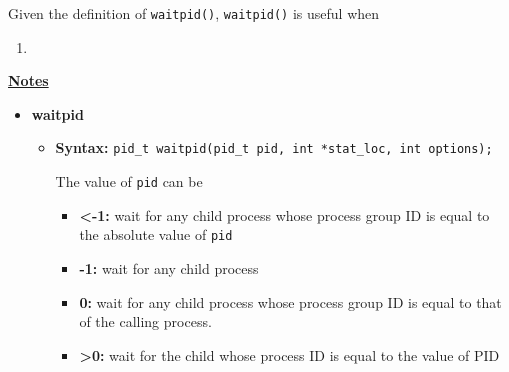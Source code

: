 \documentclass[12pt]{article}
\begin{document}
\begin{enumerate}[1.]
    \bigskip

    Given the definition of \texttt{waitpid()}, \texttt{waitpid()} is useful when

    \begin{enumerate}[1)]
        \item
    \end{enumerate}

    \bigskip

    \underline{\textbf{Notes}}

    \bigskip

    \begin{itemize}
        \item \textbf{waitpid}

        \begin{itemize}
            \item \textbf{Syntax:} \texttt{pid\_t waitpid(pid\_t pid, int *stat\_loc, int options);}

            \bigskip

            The value of \texttt{pid} can be
            \begin{itemize}
                \item \textbf{<-1:} wait for any child process whose process group ID is equal to
                the absolute value of \texttt{pid}
                \item \textbf{-1:} wait for any child process
                \item \textbf{0:} wait for any child process whose process group ID is equal to that of the
                calling process.
                \item \textbf{>0:} wait for the child whose process ID is equal to the value of PID
            \end{itemize}
        \end{itemize}
    \end{itemize}

\end{enumerate}
\end{document}
